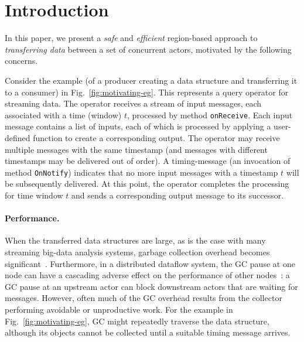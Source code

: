 \newcommand{\TODO}[1]{\textbf{TODO: #1}} \newcommand{\eg}{\emph{e.g.}}
\newcommand{\ie}{\emph{i.e.}}

\section{Introduction} \label{sec:introduction}

In this paper, we present a \emph{safe} and \emph{efficient} region-based approach
to \emph{transferring data} between a set of concurrent actors, motivated by the following concerns.

Consider the example (of  a producer creating a data structure and transferring it to a consumer)
in Fig.~\ref{fig:motivating-eg}. This represents a  query operator for streaming data. 
The operator receives a stream of input messages, each
associated with a time (window) $t$, processed by method
\texttt{onReceive}.  Each input message contains a list of inputs,
each of which is processed by applying a user-defined function to
create a corresponding output.  The operator may receive multiple
messages with the same timestamp (and messages with different
timestamps may be delivered out of order). A timing-message (an
invocation of method \texttt{OnNotify}) indicates that no more input
messages with a timestamp $t$ will be subsequently delivered.  At this
point, the operator completes the processing for time window $t$ and
sends a corresponding output message to its successor.




\paragraph{Performance.}
When the transferred data structures are large, as is the case with many streaming big-data
analysis systems, garbage collection overhead becomes
significant~\cite{Broom:HotOS}.  Furthermore, in a distributed
dataflow system, the GC pause at one node can have a cascading adverse
effect on the performance of other nodes~\cite{Broom:HotOS,harris15}:
a GC pause at an upstream actor can block downstream actors that are waiting for
messages.  However, often much of the GC overhead results from the
collector performing avoidable or unproductive work.  For the example
in Fig.~\ref{fig:motivating-eg}, GC might repeatedly traverse the
 data structure, although its objects cannot be collected until a
suitable timing message arrives.


